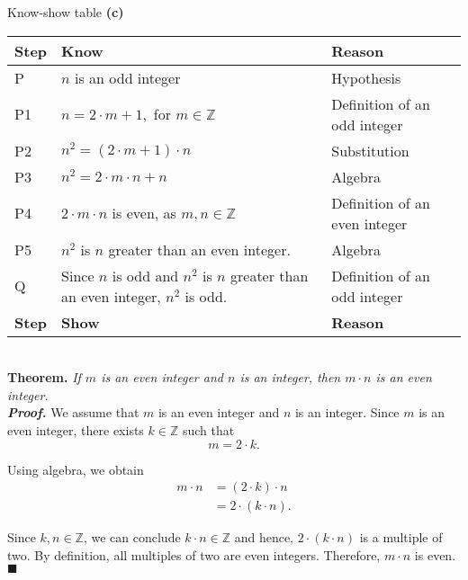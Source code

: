 \documentclass{article}
\begin{document}
Know-show table \textbf{(c)}
\begin{center}
\begin{tabular}{ | l | l | l | }
\hline
\textbf{Step} & \textbf{Know} & \textbf{Reason}\\
\hline
P  & $n$ is an odd integer & Hypothesis\\
\hline
P1 & $n = 2 \cdot m + 1,$ for $m \in \mathbb{Z}$ & Definition of an odd integer\\
\hline
P2 & $n^2 = (2 \cdot m + 1) \cdot n$ & Substitution\\
\hline 
P3 & $n^2 = 2 \cdot m \cdot n + n$ & Algebra\\
\hline
P4 & $2 \cdot m \cdot n$ is even, as $m, n \in \mathbb{Z}$ & Definition of an even integer\\
\hline
P5 & $n^2$ is $n$ greater than an even integer. & Algebra\\
\hline
Q & Since $n$ is odd and $n^2$ is $n$ greater than an even integer, $n^2$ is odd. & Definition of an odd integer\\
\hline
\textbf{Step} & \textbf{Show} & \textbf{Reason}\\
\hline
\end{tabular}
\end{center}

\textbf{\\Theorem.} \textit{If $m$ is an even integer and $n$ is an integer, then $m \cdot n$ is an even integer.}\\
\textit{\textbf{Proof.}} We assume that $m$ is an even integer and $n$ is an integer. Since $m$ is an even integer, there exists $k \in \mathbb{Z}$ such that
\begin{equation*}
m = 2 \cdot k.
\end{equation*}

Using algebra, we obtain
\begin{align*}
m \cdot n  &= (2 \cdot k) \cdot n \\
&= 2 \cdot (k \cdot n).
\end{align*}

Since $k, n \in \mathbb{Z}$, we can conclude $k \cdot n \in \mathbb{Z}$ and hence, $2 \cdot (k \cdot n)$ is a multiple of two. By definition, all  multiples of two are even integers. Therefore, $m \cdot n$ is even.\hfill$\blacksquare$
\end{document}
